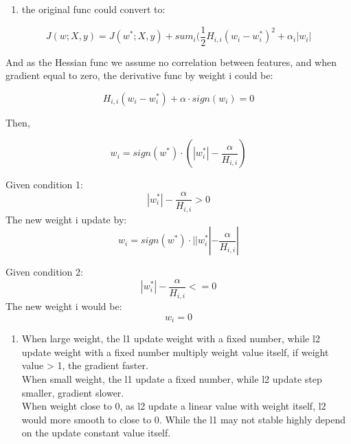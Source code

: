 \documentclass[11pt]{article}
\providecommand{\tightlist}{%
      \setlength{\itemsep}{0pt}\setlength{\parskip}{0pt}}
\begin{document}
    \begin{enumerate}
\def\labelenumi{(\roman{enumi})}
\setcounter{enumi}{1}
\tightlist
\item
  the original func could convert to:
\end{enumerate}

\begin{equation}
J(w; X, y) = J(w^*; X, y) + sum_i(\frac{1}{2}H_{i,i}(w_i - w_i^*)^2 + \alpha_i|w_i|
\end{equation}

And as the Hessian func we assume no correlation between features, and
when gradient equal to zero, the derivative func by weight i could be:

\begin{equation}
H_{i,i}(w_i - w_i^*) + \alpha \cdot sign(w_i) = 0
\end{equation}

Then,

\begin{equation}
w_i = sign(w^*) \cdot (|w_i^*| - \frac{\alpha}{H_{i,i}})
\end{equation}

Given condition 1: \begin{equation}
|w_i^*| - \frac{\alpha}{H_{i,i}} > 0
\end{equation} The new weight i update by: \begin{equation}
w_i = sign(w^*) \cdot ||w_i^*| - \frac{\alpha}{H_{i,i}}|
\end{equation}

Given condition 2: \begin{equation}
|w_i^*| - \frac{\alpha}{H_{i,i}} <= 0
\end{equation} The new weight i would be: \begin{equation}
w_i = 0
\end{equation}

    \begin{enumerate}
\def\labelenumi{(\roman{enumi})}
\setcounter{enumi}{2}
\tightlist
\item
  When large weight, the l1 update weight with a fixed number, while l2
  update weight with a fixed number multiply weight value itself, if
  weight value \textgreater{} 1, the gradient faster.\\
  When small weight, the l1 update a fixed number, while l2 update step
  smaller, gradient slower.\\
  When weight close to 0, as l2 update a linear value with weight
  itself, l2 would more smooth to close to 0. While the l1 may not
  stable highly depend on the update constant value itself.
\end{enumerate}
\end{document}
